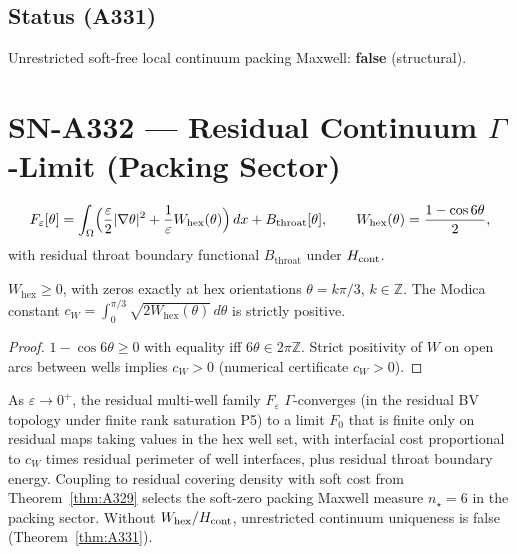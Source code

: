 \subsection*{Status (A331)}
Unrestricted soft-free local continuum packing Maxwell: \textbf{false} (structural).

\section{SN-A332 --- Residual Continuum $\Gamma$-Limit (Packing Sector)}
\label{sec:SN-A332}

\begin{definition}
\label{def:A332-F}
\begin{equation}
F_\varepsilon[\theta]
=
\int_{\Omega}
\Bigl(
\frac{\varepsilon}{2}|\nabla\theta|^2
+
\frac{1}{\varepsilon}W_{\mathrm{hex}}(\theta)
\Bigr)\,dx
+
B_{\mathrm{throat}}[\theta],
\qquad
W_{\mathrm{hex}}(\theta)=\frac{1-\cos 6\theta}{2},
\end{equation}
with residual throat boundary functional $B_{\mathrm{throat}}$ under $H_{\rm cont}$.
\end{definition}

\begin{lemma}
\label{lem:A332-W}
$W_{\mathrm{hex}}\ge 0$, with zeros exactly at hex orientations $\theta=k\pi/3$, $k\in\mathbb{Z}$.
The Modica constant $c_W=\int_{0}^{\pi/3}\sqrt{2W_{\mathrm{hex}}(\theta)}\,d\theta$ is strictly positive.
\end{lemma}

\begin{proof}
$1-\cos 6\theta\ge 0$ with equality iff $6\theta\in 2\pi\mathbb{Z}$.
Strict positivity of $W$ on open arcs between wells implies $c_W>0$ (numerical certificate $c_W>0$).
\end{proof}

\begin{theorem}
\label{thm:A332}
As $\varepsilon\to 0^+$, the residual multi-well family $F_\varepsilon$ $\Gamma$-converges (in the residual BV topology under finite rank saturation P5) to a limit $F_0$ that is finite only on residual maps taking values in the hex well set, with interfacial cost proportional to $c_W$ times residual perimeter of well interfaces, plus residual throat boundary energy.
Coupling to residual covering density with soft cost from Theorem~\ref{thm:A329} selects the soft-zero packing Maxwell measure $n_\star=6$ in the packing sector.
Without $W_{\mathrm{hex}}/H_{\rm cont}$, unrestricted continuum uniqueness is false (Theorem~\ref{thm:A331}).
\end{theorem}

